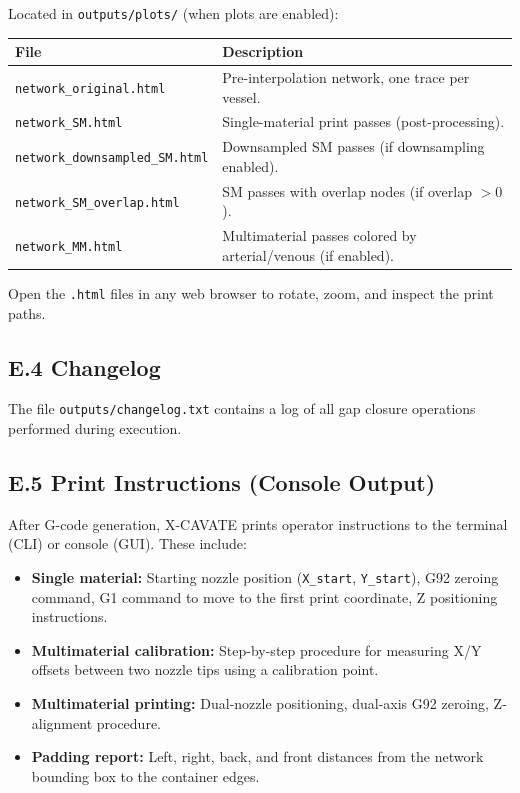 \documentclass[11pt,letterpaper]{article}
\newcommand{\code}[1]{\texttt{#1}}
\begin{document}
Located in \code{outputs/plots/} (when plots are enabled):

\begin{longtable}{@{}L{5.5cm}p{8.5cm}@{}}
\toprule
\textbf{File} & \textbf{Description} \\
\midrule
\code{network\_original.html} & Pre-interpolation network, one trace per vessel. \\
\code{network\_SM.html} & Single-material print passes (post-processing). \\
\code{network\_downsampled\_SM.html} & Downsampled SM passes (if downsampling enabled). \\
\code{network\_SM\_overlap.html} & SM passes with overlap nodes (if overlap $> 0$). \\
\code{network\_MM.html} & Multimaterial passes colored by arterial/venous (if enabled). \\
\bottomrule
\end{longtable}

Open the \code{.html} files in any web browser to rotate, zoom, and inspect the print paths.

\subsection{E.4 Changelog}

The file \code{outputs/changelog.txt} contains a log of all gap closure operations performed during execution.

\subsection{E.5 Print Instructions (Console Output)}

After G-code generation, X-CAVATE prints operator instructions to the terminal (CLI) or console (GUI). These include:

\begin{itemize}
    \item \textbf{Single material:} Starting nozzle position (\code{X\_start}, \code{Y\_start}), G92 zeroing command, G1 command to move to the first print coordinate, Z positioning instructions.
    \item \textbf{Multimaterial calibration:} Step-by-step procedure for measuring X/Y offsets between two nozzle tips using a calibration point.
    \item \textbf{Multimaterial printing:} Dual-nozzle positioning, dual-axis G92 zeroing, Z-alignment procedure.
    \item \textbf{Padding report:} Left, right, back, and front distances from the network bounding box to the container edges.
\end{itemize}
\end{document}
